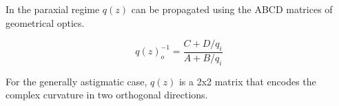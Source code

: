 In the paraxial regime $q(z)$ can be propagated using the ABCD matrices of geometrical optics.

\begin{equation}
    q(z)^{-1}_{o} = \frac{C + D/q_{i}}{A + B/q_{i}}
\end{equation}

For the generally astigmatic case, $q(z)$ is a 2x2 matrix that encodes the complex curvature in two orthogonal directions\cite{Ashcraft2020,cai_decentered_nodate}. 
